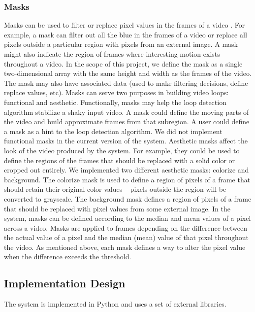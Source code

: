 \subsubsection{Masks}
\label{sec:Masks}
Masks can be used to filter or replace pixel values in the frames of a video \cite{Piccardi2004}. For example, a mask can filter out all the blue in the frames of a video or replace all pixels outside a particular region with pixels from an external image. A mask might also indicate the region of frames where interesting motion exists throughout a video. 
In the scope of this project, we define the mask as a single two-dimensional array with the same height and width as the frames of the video. The mask may also have associated data (used to make filtering decisions, define replace values, etc). 
Masks can serve two purposes in building video loops: functional and aesthetic. Functionally, masks may help the loop detection algorithm stabilize a shaky input video. A mask could define the moving parts of the video and build approximate frames from that subregion. A user could define a mask as a hint to the loop detection algorithm. We did not implement functional masks in the current version of the system.
Aesthetic masks affect the look of the video produced by the system. For example, they could be used to define the regions of the frames that should be replaced with a solid color or cropped out entirely. We implemented two different aesthetic masks: colorize and background. The colorize mask is used to define a region of pixels of a frame that should retain their original color values -- pixels outside the region will be converted to grayscale. The background mask defines a region of pixels of a frame that should be replaced with pixel values from some external image. 
In the system, masks can be defined according to the median and mean values of a pixel across a video. Masks are applied to frames depending on the difference between the actual value of a pixel and the median (mean) value of that pixel throughout the video. As mentioned above, each mask defines a way to alter the pixel value when the difference exceeds the threshold. 
\subsection{Implementation Design}
\label{sec:ImplementationDesign}
The system is implemented in Python and uses a set of external libraries. 
